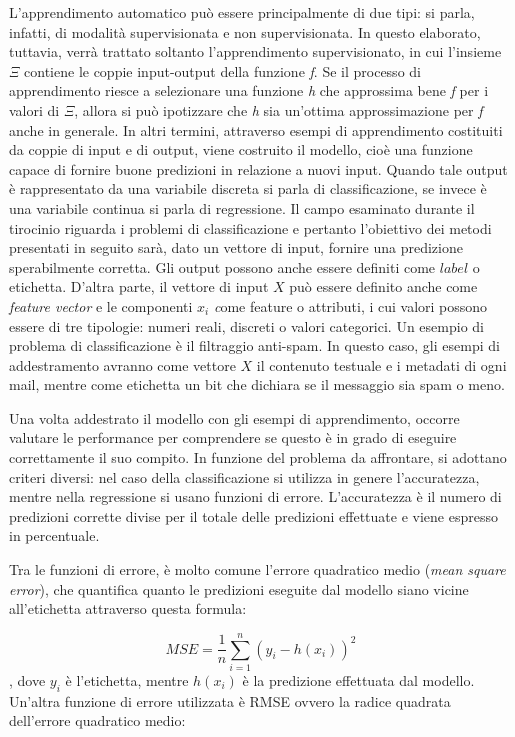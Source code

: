 \documentclass[11pt,  oneside, openany]{book}
\begin{document}
L'apprendimento automatico può essere principalmente di due tipi: si parla, infatti, di modalità supervisionata e non supervisionata. In questo elaborato, tuttavia, verrà trattato soltanto l'apprendimento supervisionato, in cui l'insieme $\Xi$ contiene le coppie input-output della funzione \textit {f}. 
Se il processo di apprendimento riesce a selezionare una funzione \textit {h} che approssima bene \textit {f} per i valori di $\Xi$, allora si può ipotizzare che \textit {h} sia un'ottima approssimazione per \textit {f} anche in generale. In altri termini, attraverso esempi di apprendimento costituiti da coppie di input e di output, viene costruito il modello, cioè una funzione capace di fornire buone predizioni in relazione a nuovi input. 
Quando tale output è rappresentato da una variabile discreta si parla di classificazione, se invece è una variabile continua si parla di regressione. Il campo esaminato durante il tirocinio riguarda i problemi di classificazione e pertanto l'obiettivo dei metodi presentati in seguito sarà, dato un vettore di input, fornire una predizione sperabilmente corretta. Gli output possono anche essere definiti come $label$ o etichetta. D'altra parte, il vettore di input $X$ può essere definito anche come \textit {feature vector} e le componenti $x_i$ \textit come {feature} o attributi, i cui valori possono essere di tre tipologie: numeri reali, discreti o valori categorici.
Un esempio di problema di classificazione è il filtraggio anti-spam. In questo caso, gli esempi di addestramento avranno come vettore $X$  il contenuto testuale e i metadati di ogni mail, mentre come etichetta un bit che dichiara se il messaggio sia spam o meno.

Una volta addestrato il modello con gli esempi di apprendimento, occorre valutare le performance per comprendere se questo è in grado di eseguire correttamente il suo compito. In funzione del problema da affrontare, si adottano criteri diversi: nel caso della classificazione si utilizza in genere l'accuratezza, mentre nella regressione si  usano funzioni di errore. L'accuratezza è il numero di predizioni corrette divise per il totale delle predizioni effettuate e viene espresso in percentuale. 

Tra le funzioni di errore, è molto comune l'errore quadratico medio (\textit{mean square error}), che quantifica quanto le predizioni eseguite dal modello siano vicine all'etichetta attraverso questa formula: 

$$MSE = \frac{1}{n}\sum_{i=1}^{n}(y_{i} - h(x_{i}))^{2}$$, 
dove $y_i$ è l'etichetta, mentre $h(x_{i})$ è la predizione effettuata dal modello. 
Un'altra funzione di errore utilizzata è RMSE ovvero la radice quadrata dell'errore quadratico medio: 
\end{document}
